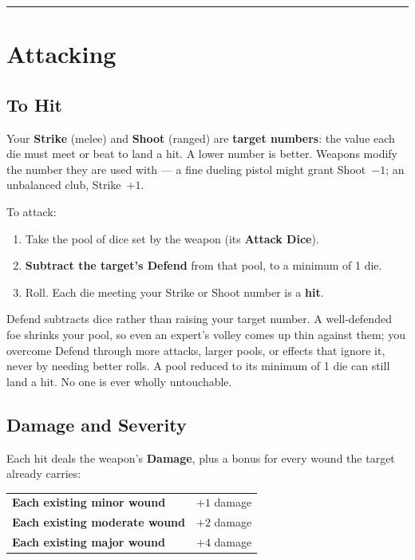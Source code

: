 \medskip\hrule\medskip

\section{Attacking}

\subsection{To Hit}

Your \textbf{Strike} (melee) and \textbf{Shoot} (ranged) are \textbf{target numbers}: the value each die must meet or beat to land a hit. A lower number is better. Weapons modify the number they are used with --- a fine dueling pistol might grant Shoot~$-1$; an unbalanced club, Strike~$+1$.

To attack:

\begin{enumerate}
    \item Take the pool of dice set by the weapon (its \textbf{Attack Dice}).
    \item \textbf{Subtract the target's Defend} from that pool, to a minimum of 1 die.
    \item Roll. Each die meeting your Strike or Shoot number is a \textbf{hit}.
\end{enumerate}

Defend subtracts dice rather than raising your target number. A well-defended foe shrinks your pool, so even an expert's volley comes up thin against them; you overcome Defend through more attacks, larger pools, or effects that ignore it, never by needing better rolls. A pool reduced to its minimum of 1 die can still land a hit. No one is ever wholly untouchable.

\subsection{Damage and Severity}

Each hit deals the weapon's \textbf{Damage}, plus a bonus for every wound the target already carries:

\begin{center}
\begin{tabular}{ll}
\textbf{Each existing minor wound} & $+1$ damage \\
\textbf{Each existing moderate wound} & $+2$ damage \\
\textbf{Each existing major wound} & $+4$ damage \\
\end{tabular}
\end{center}

